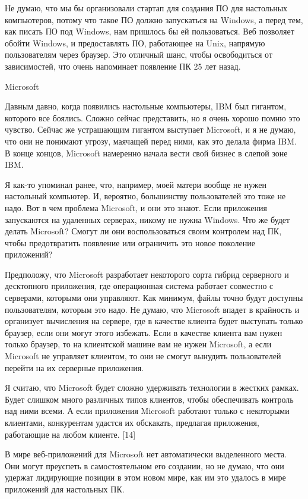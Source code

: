 \documentclass[ebook,12pt,oneside,openany]{memoir}
\begin{document}
Не думаю, что мы бы организовали стартап для создания ПО для
настольных компьютеров, потому что такое ПО должно запускаться на
Windows, а перед тем, как писать ПО под Windows, нам пришлось бы ей
пользоваться. Веб позволяет обойти Windows, и предоставлять ПО,
работающее на Unix, напрямую пользователям через браузер. Это отличный
шанс, чтобы освободиться от зависимостей, что очень напоминает
появление ПК 25 лет назад.

Microsoft

Давным давно, когда появились настольные компьютеры, IBM был гигантом,
которого все боялись. Сложно сейчас представить, но я очень хорошо
помню это чувство. Сейчас же устрашающим гигантом выступает Microsoft,
и я не думаю, что они не понимают угрозу, маячащей перед ними, как это
делала фирма IBM. В конце концов, Microsoft намеренно начала вести
свой бизнес в слепой зоне IBM.

Я как-то упоминал ранее, что, например, моей матери вообще не нужен
настольный компьютер. И, вероятно, большинству пользователей это тоже
не надо. Вот в чем проблема Microsoft, и они это знают. Если
приложения запускаются на удаленных серверах, никому не нужна Windows.
Что же будет делать Microsoft? Смогут ли они воспользоваться своим
контролем над ПК, чтобы предотвратить появление или ограничить это
новое поколение приложений?

Предположу, что Microsoft разработает некоторого сорта гибрид
серверного и десктопного приложения, где операционная система работает
совместно с серверами, которыми они управляют. Как минимум, файлы
точно будут доступны пользователям, которым это надо. Не думаю, что
Microsoft впадет в крайность и организует вычисления на сервере, где в
качестве клиента будет выступать только браузер, если они могут этого
избежать. Если в качестве клиента вам нужен только браузер, то на
клиентской машине вам не нужен Microsoft, а если Microsoft не
управляет клиентом, то они не смогут вынудить пользователей перейти на
их серверные приложения.

Я считаю, что Microsoft будет сложно удерживать технологии в жестких
рамках. Будет слишком много различных типов клиентов, чтобы
обеспечивать контроль над ними всеми. А если приложения Microsoft
работают только с некоторыми клиентами, конкурентам удастся их
обскакать, предлагая приложения, работающие на любом клиенте. [14]

В мире веб-приложений для Microsoft нет автоматически выделенного
места. Они могут преуспеть в самостоятельном его создании, но не
думаю, что они удержат лидирующие позиции в этом новом мире, как им
это удалось в мире приложений для настольных ПК.
\end{document}
